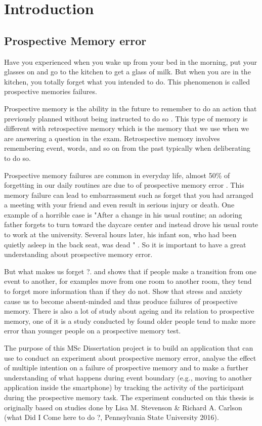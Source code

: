 
\chapter{Introduction}
\section{Prospective Memory error}


Have you experienced when you wake up from your bed in the morning, put your glasses on and
go to the kitchen to get a glass of milk. But when you are in the kitchen, you totally forget what
you intended to do. This phenomenon is called prospective memories failures.

Prospective memory is the ability in the future to remember to do an action that previously planned without being instructed to do so \citep{GROOT2002}. This type of memory is different with retrospective memory which is the memory that we use when we are answering a question in the exam. Retrospective memory involves remembering event, words, and so on from the past typically when deliberating to do so.

Prospective memory failures are common in everyday life, almost 50\% of forgetting in our daily routines are due to of prospective
memory error \citep{Crovitz1984}. This memory failure can lead to embarrassment such as forget that you had arranged a meeting with your friend and even result in
serious injury or death. One example of a horrible case is "After a change in his usual routine; an
adoring father forgets to turn toward the daycare center and instead drove his usual route to work
at the university. Several hours later, his infant son, who had been quietly asleep in the back seat,
was dead " \citep{Einstein2005}. So it is important to have a great understanding about prospective memory error.

But what makes us forget ?. \cite{Radvansky2006} and \cite{Radvansky2010} shows that if people make a transition from one event to another, for examples move
from one room to another room, they tend to forget more information than if they do not.
\cite{Cockburn1994} Show that stress and anxiety cause us to become absent-minded and
thus produce failures of prospective memory. There is also a lot of study about ageing and its relation to prospective memory, one of it is a study conducted by \cite{Scullin2012} found older people tend to make more error than younger people on a prospective memory test.

The purpose of this MSc Dissertation project is to build an application that can use to conduct an experiment about prospective memory error, analyse the effect of multiple intention on a failure of prospective memory and to make a further understanding of what happens
during event boundary (e.g., moving to another application inside the smartphone) by tracking the activity of the participant during the prospective memory task.
The experiment conducted on this thesis is originally based on studies done by Lisa M. Stevenson \&
Richard A. Carlson (what Did I Come here to do ?, Pennsylvania State University 2016).


